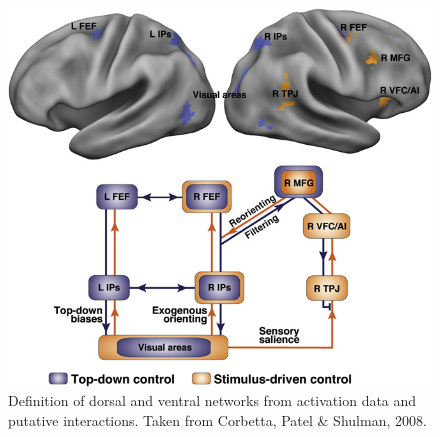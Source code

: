 \documentclass[a4paper, 12pt]{scrreprt}
\begin{document}
\begin{figure}
	\includegraphics[scale=0.4]{img/attentionnetworks.png}
	\caption[Dorsal and ventral attention networks]
	{\small{Definition of dorsal and ventral networks from activation data and putative interactions. Taken from Corbetta, Patel \& Shulman, 2008.}}
	\label{fig:Networks}
\end{figure}
\end{document}
